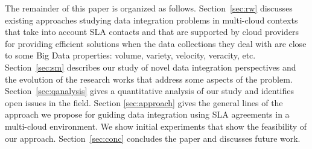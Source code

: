 The remainder of this paper is organized as follows. 
Section~\ref{sec:rw} discusses existing approaches studying data integration problems in multi-cloud contexts that take into account SLA contacts and that are supported by cloud providers for providing efficient solutions when the data collections they deal with are close to some Big Data properties: volume, variety, velocity, veracity, etc.
Section~\ref{sec:sm} describes our study of novel data integration perspectives and the evolution of the research works that address some aspects of the problem. Section~\ref{sec:qanalysis} gives a quantitative analysis of our study and identifies open issues in the field. Section \ref{sec:approach} gives the general lines of the approach we propose for guiding data integration using SLA agreements in a multi-cloud environment. We show initial experiments that show the feasibility of our approach.  
Section~\ref{sec:conc} concludes the paper and discusses future work. 


